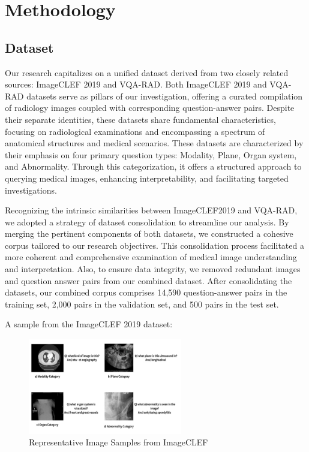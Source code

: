 \documentclass[pdflatex,sn-mathphys-num]{sn-jnl}%
\begin{document}
\section{Methodology}\label{sec3}
\subsection{Dataset}\label{subsec3.1}

Our research capitalizes on a unified dataset derived from two closely related sources: ImageCLEF 2019 and VQA-RAD. Both ImageCLEF 2019 and VQA-RAD datasets serve as pillars of our investigation, offering a curated compilation of radiology images coupled with corresponding question-answer pairs. Despite their separate identities, these datasets share fundamental characteristics, focusing on radiological examinations and encompassing a spectrum of anatomical structures and medical scenarios. These datasets are characterized by their emphasis on four primary question types: Modality, Plane, Organ system, and Abnormality. Through this categorization, it offers a structured approach to querying medical images, enhancing interpretability, and facilitating targeted investigations.

Recognizing the intrinsic similarities between ImageCLEF2019 and VQA-RAD, we adopted a strategy of dataset consolidation to streamline our analysis. By merging the pertinent components of both datasets, we constructed a cohesive corpus tailored to our research objectives. This consolidation process facilitated a more coherent and comprehensive examination of medical image understanding and interpretation. Also, to ensure data integrity, we removed redundant images and question answer pairs from our combined dataset. 
After consolidating the datasets, our combined corpus comprises 14,590 question-answer pairs in the training set, 2,000 pairs in the validation set, and 500 pairs in the test set.

A sample from the ImageCLEF 2019 dataset:
\begin{figure}[h]
\includegraphics[width=0.6\textwidth]{figs/representative_imageclef.png}
\caption{Representative Image Samples from ImageCLEF}
\centering
\end{figure}
\end{document}
